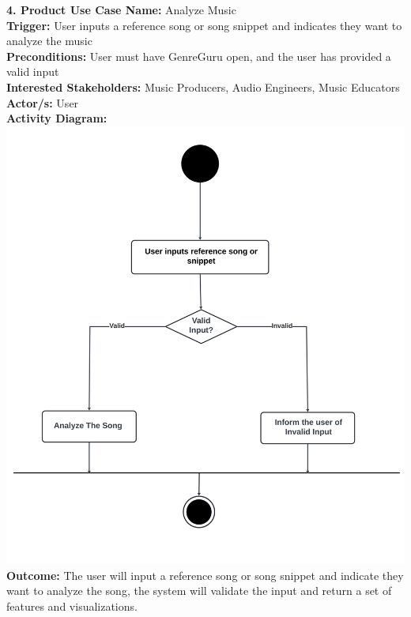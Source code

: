 \documentclass[12pt]{article}
\begin{document}
\noindent \textbf{4. Product Use Case Name:} Analyze Music \\
\textbf{Trigger:} User inputs a reference song or song snippet and indicates they want to analyze the music \\
\textbf{Preconditions:} User must have GenreGuru open, and the user has provided a valid input \\
\textbf{Interested Stakeholders:} Music Producers, Audio Engineers, Music Educators \\
\textbf{Actor/s:} User \\
\textbf{Activity Diagram:} \\
\includegraphics[width=\textwidth]{analyze_song.png} \\
\textbf{Outcome:} The user will input a reference song or song snippet and indicate they want to analyze the song, the system will validate the input and return a set of features and visualizations.

\vspace{1cm}
\end{document}
